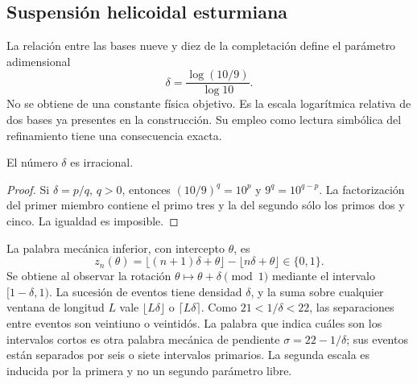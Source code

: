 \subsection{Suspensión helicoidal esturmiana}

La relación entre las bases nueve y diez de la completación define el parámetro adimensional
\begin{equation}
 \delta=\frac{\log(10/9)}{\log10}.
 \label{eq:delta-sturm}
\end{equation}
No se obtiene de una constante física objetivo. Es la escala logarítmica relativa de dos bases ya presentes en la construcción. Su empleo como lectura simbólica del refinamiento tiene una consecuencia exacta.

\begin{lemma}
El número \(\delta\) es irracional.
\end{lemma}
\begin{proof}
Si \(\delta=p/q\), \(q>0\), entonces \((10/9)^q=10^p\) y \(9^q=10^{q-p}\). La factorización del primer miembro contiene el primo tres y la del segundo sólo los primos dos y cinco. La igualdad es imposible.
\end{proof}

La palabra mecánica inferior, con intercepto \(\theta\), es
\[
 z_n(\theta)=\lfloor(n+1)\delta+\theta\rfloor-\lfloor n\delta+\theta\rfloor\in\{0,1\}.
\]
Se obtiene al observar la rotación \(\theta\mapsto\theta+\delta\pmod1\) mediante el intervalo \([1-\delta,1)\). La sucesión de eventos tiene densidad \(\delta\), y la suma sobre cualquier ventana de longitud \(L\) vale \(\lfloor L\delta\rfloor\) o \(\lceil L\delta\rceil\). Como \(21<1/\delta<22\), las separaciones entre eventos son veintiuno o veintidós. La palabra que indica cuáles son los intervalos cortos es otra palabra mecánica de pendiente \(\sigma=22-1/\delta\); sus eventos están separados por seis o siete intervalos primarios. La segunda escala es inducida por la primera y no un segundo parámetro libre.



